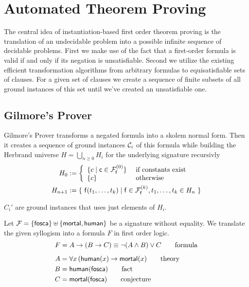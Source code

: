 
\chapter{Automated Theorem Proving}




The central idea of instantiation-based first order theorem proving is the
translation of an undecidable problem into a possible infinite sequence of decidable problems.
First we make use of the fact that a first-order formula is valid if and only if its negation is unsatisfiable.
Second we utilize the existing efficient transformation algorithms from arbitrary formulas to equisatisfiable sets of clauses. 
For a given set of clauses we create a sequence of finite subsets of all ground instances of this set
until we've created an unsatisfiable one. 




\section{Gilmore's Prover}

Gilmore's Prover transforms a negated formula into a skolem normal form.
Then it creates a sequence of ground instances ${\mathcal C}_i$ of this formula while building the Herbrand universe 
$H = \bigcup_{n\geq 0} H_i$ for the underlying signature
recursivly
\begin{align*}
H_0 &:= \left\{ 
	\begin{array}{ll}
	\{ c \mid \mc\in\mcFfn[0] \} 
	&\text{if constants exist}\\
	\{ c \}
	&\text{otherwise}
	\end{array}
\right. 
\\
H_{n+1} &:= \{\  
	\mf(t_1,\ldots,t_k) \mid
	\mf\in\mcFfn[k],
	t_1,\ldots,t_k \in H_n
\ \}
\end{align*}

$C_i'$ are ground instances that uses just elements of $H_i$. 





\begin{example}
	Let ${\mathcal F} = \{ \mathsf{fosca} \} \uplus \{ \mathsf{mortal}, \mathsf{human} \}$ be a signature without equality. 
	We translate the given syllogism into a formula $F$ in first order logic.
	\begin{align*}
		F &= A \rightarrow (B \rightarrow C) \equiv \lnot(A\land B) \lor C 
		\tag*{formula}
		\\[0.5em]
		A &= \forall x\, ( \mathsf{human}(x) \rightarrow \mathsf{mortal}(x) 
		\tag*{theory}
		\\
		B &= \mathsf{human}(\mathsf{fosca}) 
		\tag*{fact}
		\\
		C &= \mathsf{mortal}(\mathsf{fosca})
		\tag*{conjecture}
	\end{align*}
\end{example}
 
